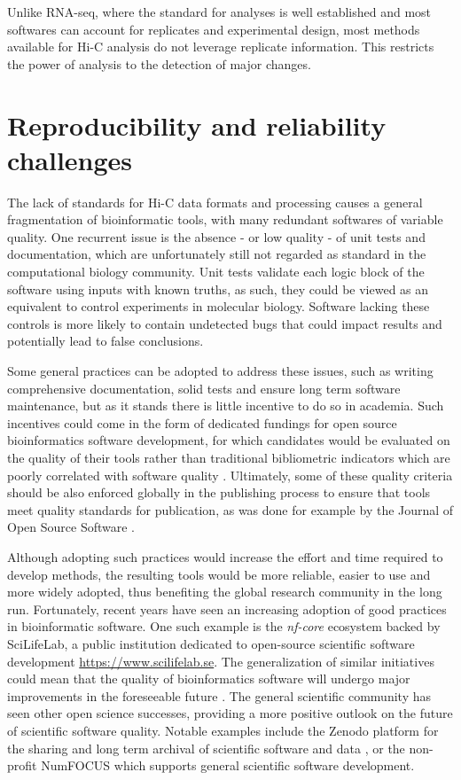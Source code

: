Unlike RNA-seq, where the standard for analyses is well established and most softwares can account for replicates and experimental design, most methods available for Hi-C analysis do not leverage replicate information. This restricts the power of analysis to the detection of major changes.

\section{Reproducibility and reliability challenges}

The lack of standards for Hi-C data formats and processing causes a general fragmentation of bioinformatic tools, with many redundant softwares of variable quality. One recurrent issue is the absence - or low quality - of unit tests and documentation, which are unfortunately still not regarded as standard in the computational biology community. Unit tests validate each logic block of the software using inputs with known truths, as such, they could be viewed as an equivalent to control experiments in molecular biology. Software lacking these controls is more likely to contain undetected bugs that could impact results and potentially lead to false conclusions.

Some general practices can be adopted to address these issues, such as writing comprehensive documentation, solid tests and ensure long term software maintenance, but as it stands there is little incentive to do so in academia. Such incentives could come in the form of dedicated fundings for open source bioinformatics software development, for which candidates would be evaluated on the quality of their tools rather than traditional bibliometric indicators which are poorly correlated with software quality \cite{gardnerSustainedSoftwareDevelopment2021}. Ultimately, some of these quality criteria should be also enforced globally in the publishing process to ensure that tools meet quality standards for publication, as was done for example by the Journal of Open Source Software \cite{ReviewCriteriaJOSS}.

Although adopting such practices would increase the effort and time required to develop methods, the resulting tools would be more reliable, easier to use and more widely adopted, thus benefiting the global research community in the long run. Fortunately, recent years have seen an increasing adoption of good practices in bioinformatic software. One such example is the \textit{nf-core} ecosystem backed by SciLifeLab, a public institution dedicated to open-source scientific software development \url{https://www.scilifelab.se}. The generalization of similar initiatives could mean that the quality of bioinformatics software will undergo major improvements in the foreseeable future \cite{ewelsNfcoreFrameworkCommunitycurated2020,wrattenReproducibleScalableShareable2021}. The general scientific community has seen other open science successes, providing a more positive outlook on the future of scientific software quality. Notable examples include the Zenodo platform for the sharing and long term archival of scientific software and data \cite{ZenodoResearchShared}, or the non-profit NumFOCUS \cite{NumFOCUSNonprofitSupporting} which supports general scientific software development. 